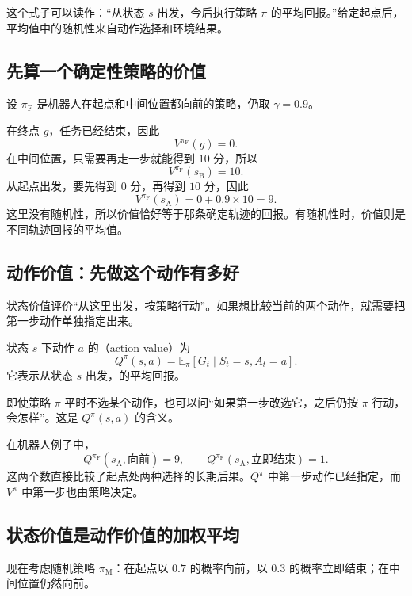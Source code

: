\documentclass[UTF8]{ctexart}
\begin{document}
这个式子可以读作：“从状态 $s$ 出发，今后执行策略 $\pi$ 的平均回报。”给定起点后，平均值中的随机性来自动作选择和环境结果。

\subsection{先算一个确定性策略的价值}

设 $\pi_{\mathrm F}$ 是机器人在起点和中间位置都向前的策略，仍取 $\gamma=0.9$。

在终点 $g$，任务已经结束，因此
\[
  V^{\pi_{\mathrm F}}(g)=0.
\]
在中间位置，只需要再走一步就能得到 $10$ 分，所以
\[
  V^{\pi_{\mathrm F}}(s_{\mathrm B})=10.
\]
从起点出发，要先得到 $0$ 分，再得到 $10$ 分，因此
\[
  V^{\pi_{\mathrm F}}(s_{\mathrm A})=0+0.9\times10=9.
\]
这里没有随机性，所以价值恰好等于那条确定轨迹的回报。有随机性时，价值则是不同轨迹回报的平均值。

\subsection{动作价值：先做这个动作有多好}

状态价值评价“从这里出发，按策略行动”。如果想比较当前的两个动作，就需要把第一步动作单独指定出来。

\begin{definition}[动作价值函数]
状态 $s$ 下动作 $a$ 的（action value）为
\begin{equation}
  Q^\pi(s,a)=\mathbb E_\pi[G_t\mid S_t=s,A_t=a].
  \label{eq:mdp-action-value}
\end{equation}
它表示从状态 $s$ 出发，的平均回报。
\end{definition}

即使策略 $\pi$ 平时不选某个动作，也可以问“如果第一步改选它，之后仍按 $\pi$ 行动，会怎样”。这是 $Q^\pi(s,a)$ 的含义。

在机器人例子中，
\[
  Q^{\pi_{\mathrm F}}(s_{\mathrm A},\text{向前})=9,
  \qquad
  Q^{\pi_{\mathrm F}}(s_{\mathrm A},\text{立即结束})=1.
\]
这两个数直接比较了起点处两种选择的长期后果。$Q^\pi$ 中第一步动作已经指定，而 $V^\pi$ 中第一步也由策略决定。

\subsection{状态价值是动作价值的加权平均}

现在考虑随机策略 $\pi_{\mathrm M}$：在起点以 $0.7$ 的概率向前，以 $0.3$ 的概率立即结束；在中间位置仍然向前。
\end{document}

